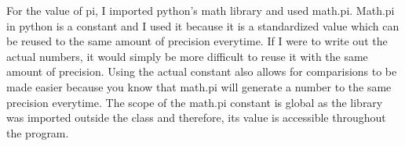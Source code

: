 \documentclass[12pt]{article}
\begin{document}
For the value of pi, I imported python's math library and used math.pi. Math.pi in python is a constant and I used it because it is a standardized value which can be reused to the same amount of precision everytime. If I were to write out the actual numbers, it would simply be more difficult to reuse it with the same amount of precision. Using the actual constant also allows for comparisions to be made easier because you know that math.pi will generate a number to the same precision everytime. The scope of the math.pi constant is global as the library was imported outside the class and therefore, its value is accessible throughout the program.


\newpage

\lstset{language=Python, basicstyle=\tiny,breaklines=true,showspaces=false,showstringspaces=false,breakatwhitespace=true}
\def\thesection{\Alph{section}} 
\end{document}
